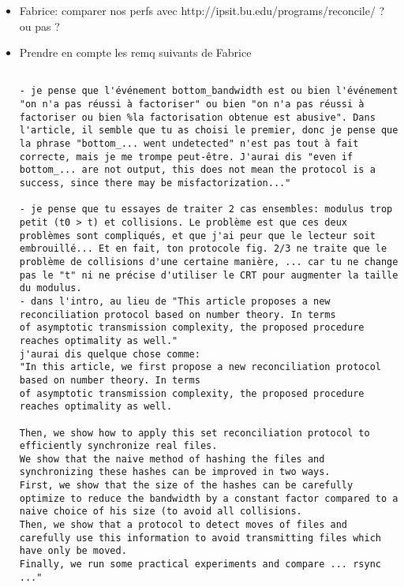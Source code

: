 \documentclass[11pt]{llncs}
\begin{document}
\begin{itemize}
\item Fabrice: comparer nos perfs avec http://ipsit.bu.edu/programs/reconcile/ ? ou pas ?

\item Prendre en compte les remq suivants de Fabrice
\begin{verbatim}

- je pense que l'événement bottom_bandwidth est ou bien l'événement "on n'a pas réussi à factoriser" ou bien "on n'a pas réussi à factoriser ou bien %la factorisation obtenue est abusive". Dans l'article, il semble que tu as choisi le premier, donc je pense que la phrase "bottom_... went undetected" n'est pas tout à fait correcte, mais je me trompe peut-être. J'aurai dis "even if bottom_... are not output, this does not mean the protocol is a success, since there may be misfactorization..."

- je pense que tu essayes de traiter 2 cas ensembles: modulus trop petit (t0 > t) et collisions. Le problème est que ces deux problèmes sont compliqués, et que j'ai peur que le lecteur soit embrouillé... Et en fait, ton protocole fig. 2/3 ne traite que le problème de collisions d'une certaine manière, ... car tu ne change pas le "t" ni ne précise d'utiliser le CRT pour augmenter la taille du modulus.
- dans l'intro, au lieu de "This article proposes a new reconciliation protocol based on number theory. In terms
of asymptotic transmission complexity, the proposed procedure reaches optimality as well."
j'aurai dis quelque chose comme:
"In this article, we first propose a new reconciliation protocol based on number theory. In terms
of asymptotic transmission complexity, the proposed procedure reaches optimality as well.

Then, we show how to apply this set reconciliation protocol to efficiently synchronize real files.
We show that the naive method of hashing the files and synchronizing these hashes can be improved in two ways.
First, we show that the size of the hashes can be carefully optimize to reduce the bandwidth by a constant factor compared to a naive choice of his size (to avoid all collisions.
Then, we show that a protocol to detect moves of files and carefully use this information to avoid transmitting files which have only be moved.
Finally, we run some practical experiments and compare ... rsync ..."
\end{verbatim}
\end{itemize}

\nocite{rsync}
\nocite{wagner}
\end{document}
